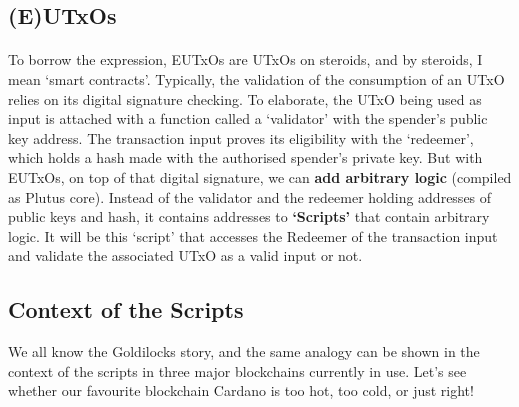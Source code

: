 \documentclass[a4paper, 11pt]{article}
\begin{document}
    \subsection{(E)UTxOs}

    \paragraph{} To borrow the expression, EUTxOs are UTxOs on steroids, and by steroids, I mean `smart contracts'. Typically, the validation of the consumption of an UTxO relies on its digital signature checking. To elaborate, the UTxO being used as input is attached with a function called a `validator' with the spender's public key address. The transaction input proves its eligibility with the `redeemer', which holds a hash made with the authorised spender's private key.  But with EUTxOs, on top of that digital signature, we can \textbf{add arbitrary logic} (compiled as Plutus core). Instead of the validator and the redeemer holding addresses of public keys and hash, it contains addresses to \textbf{`Scripts'} that contain arbitrary logic. It will be this  `script' that accesses the Redeemer of the transaction input and validate the associated UTxO as a valid input or not. 

    \subsection{Context of the Scripts}
    We all know the Goldilocks story, and the same analogy can be shown in the context of the scripts in three major blockchains currently in use. Let's see whether our favourite blockchain Cardano is too hot, too cold, or just right!
\end{document}
